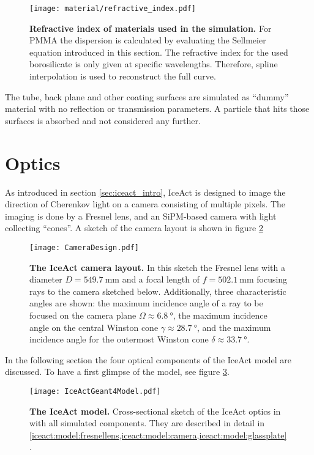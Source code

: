 \begin{figure}[H]
	\centering
	\texttt{[image: material/refractive\_index.pdf]}
	\caption[Refractive index of used materials]{\textbf{Refractive index of materials used in the simulation.} For PMMA the dispersion is calculated by evaluating the Sellmeier equation introduced in this section. The refractive index for the used borosilicate is only given at specific wavelengths. \cite{iceact:borosilicate:datasheet} Therefore, spline interpolation is used to reconstruct the full curve.}
	\label{iceact:model:material:refractive_index}	
\end{figure}

The tube, back plane and other coating surfaces are simulated as \enquote{dummy} material with no reflection or transmission parameters. A particle that hits those surfaces is absorbed and not considered any further.

\section{Optics}

As introduced in section \ref{sec:iceact_intro}, IceAct is designed to image the direction of Cherenkov light on a camera consisting of multiple pixels. The imaging is done by a Fresnel lens, and an SiPM-based camera with light collecting \enquote{cones}. A sketch of the camera layout is shown in figure \ref{iceact:camera:layout}
\begin{figure}[H]
	\centering
	\texttt{[image: CameraDesign.pdf]}
	\caption[IceAct camera layout]{\textbf{The IceAct camera layout.} \cite{iceact:camera} In this sketch the Fresnel lens with a diameter $D=\SI{549.7}{\milli\meter}$ and a focal length of $f=\SI{502.1}{\milli\meter}$ focusing rays to the camera sketched below. Additionally, three characteristic angles are shown: the maximum incidence angle of a ray to be focused on the camera plane $\Omega\approx\SI{6.8}{\degree}$, the maximum incidence angle on the central Winston cone $\gamma\approx\SI{28.7}{\degree}$, and the maximum incidence angle for the outermost Winston cone $\delta\approx\SI{33.7}{\degree}$.}
	\label{iceact:camera:layout}	
\end{figure}

In the following section the four optical components of the IceAct \geant model are discussed. To have a first glimpse of the model, see figure \ref{iceact:model:cut}.
\begin{figure}[H]
	\centering
	\texttt{[image: IceActGeant4Model.pdf]}
	\caption[IceAct \geant model]{\textbf{The IceAct \geant model.} Cross-sectional sketch of the IceAct optics in \geant with all simulated components. They are described in detail in \cref{iceact:model:fresnellens,iceact:model:camera,iceact:model:glassplate}.}
	\label{iceact:model:cut}	
\end{figure}

